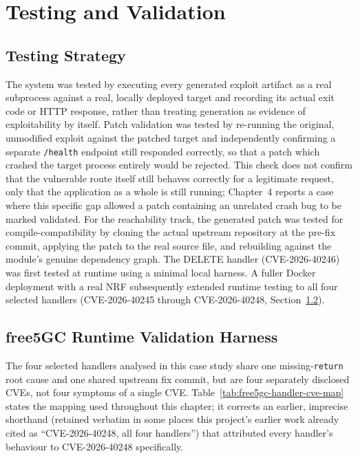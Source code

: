 \documentclass[12pt,a4paper]{report}
\begin{document}
\section{Testing and Validation}
\label{sec:testing-validation}

\subsection{Testing Strategy}

The system was tested by executing every generated exploit artifact as a real subprocess against a real, locally deployed target and recording its actual exit code or HTTP response, rather than treating generation as evidence of exploitability by itself. Patch validation was tested by re-running the original, unmodified exploit against the patched target and independently confirming a separate \texttt{/health} endpoint still responded correctly, so that a patch which crashed the target process entirely would be rejected. This check does not confirm that the vulnerable route itself still behaves correctly for a legitimate request, only that the application as a whole is still running; Chapter~4 reports a case where this specific gap allowed a patch containing an unrelated crash bug to be marked validated. For the reachability track, the generated patch was tested for compile-compatibility by cloning the actual upstream repository at the pre-fix commit, applying the patch to the real source file, and rebuilding against the module's genuine dependency graph. The DELETE handler (CVE-2026-40246) was first tested at runtime using a minimal local harness. A fuller Docker deployment with a real NRF subsequently extended runtime testing to all four selected handlers (CVE-2026-40245 through CVE-2026-40248, Section~\ref{sec:free5gc-runtime-harness}).

\subsection{free5GC Runtime Validation Harness}
\label{sec:free5gc-runtime-harness}

The four selected handlers analysed in this case study share one missing-\texttt{return} root cause and one shared upstream fix commit, but are four separately disclosed CVEs, not four symptoms of a single CVE. Table~\ref{tab:free5gc-handler-cve-map} states the mapping used throughout this chapter; it corrects an earlier, imprecise shorthand (retained verbatim in some places this project's earlier work already cited as ``CVE-2026-40248, all four handlers'') that attributed every handler's behaviour to CVE-2026-40248 specifically.
\end{document}
